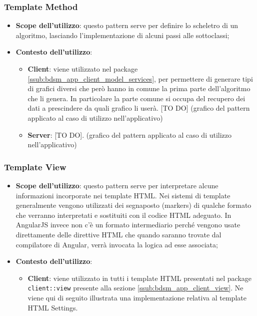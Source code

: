 	\subsubsection{Template Method} %
	\label{ssub:template_method}
		\begin{itemize}
			\item \textbf{Scope dell'utilizzo}: questo pattern serve per definire lo scheletro di un algoritmo, lasciando l'implementazione di alcuni passi alle sottoclassi;
			\item \textbf{Contesto dell'utilizzo}:
				\begin{itemize}
					\item \textbf{Client}: viene utilizzato nel package \ref{ssub:bdsm_app_client_model_services}, per permettere di generare tipi di grafici diversi che però hanno in comune la prima parte dell'algoritmo che li genera. In particolare la parte comune si occupa del recupero dei dati a prescindere da quali grafico li userà. [TO DO] \newline
					[TO DO] (grafico del pattern applicato al caso di utilizzo nell'applicativo)

					\item \textbf{Server}: [TO DO]. \newline
					[TO DO] (grafico del pattern applicato al caso di utilizzo nell'applicativo)
				\end{itemize}
		\end{itemize}


	\subsubsection{Template View} %
	\label{ssub:template_view}
		\begin{itemize}
			\item \textbf{Scope dell'utilizzo}: questo pattern serve per interpretare alcune informazioni incorporate nei template HTML. Nei sistemi di template generalmente vengono utilizzati dei segnaposto (markers) di qualche formato che verranno interpretati e sostituiti con il codice HTML adeguato. In AngularJS invece non c'è un formato intermediario perché vengono usate direttamente delle direttive HTML che quando saranno trovate dal compilatore di Angular, verrà invocata la logica ad esse associata;
			\item \textbf{Contesto dell'utilizzo}:
				\begin{itemize}
					\item \textbf{Client}: viene utilizzato in tutti i template HTML presentati nel package \texttt{client::view} presente alla sezione \ref{ssub:bdsm_app_client_view}. \newline
					Ne viene qui di seguito illustrata una implementazione relativa al template HTML Settings. \newline
					[TO DO]
				\end{itemize}
		\end{itemize}


